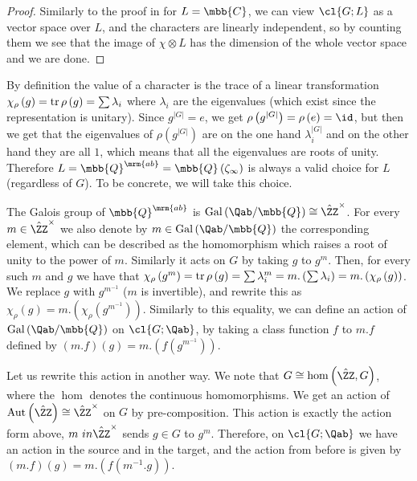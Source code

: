 \begin{proof}
	Similarly to the proof in \cite[9.1]{Ser} for $L = \mbb{C}$, we can view $\cl{G;L}$ as a vector space over $L$, and the characters are linearly independent, so by counting them we see that the image of $\chi \otimes L$ has the dimension of the whole vector space and we are done.
\end{proof}

By definition the value of a character is the trace of a linear transformation $\chi_\rho\left(g\right) = \operatorname{tr} \rho\left(g\right) = \sum \lambda_i$ where $\lambda_i$ are the eigenvalues (which exist since the representation is unitary).
Since $g^{\left|G\right|} = e$, we get $\rho\left(g^{\left|G\right|}\right) = \rho\left(e\right) = \id$, but then we get that the eigenvalues of $\rho\left(g^{\left|G\right|}\right)$ are on the one hand $\lambda_i^{\left|G\right|}$ and on the other hand they are all $1$, which means that all the eigenvalues are roots of unity.
Therefore $L = \mbb{Q}^\mrm{ab} = \mbb{Q}\left(\zeta_\infty\right)$ is always a valid choice for $L$ (regardless of $G$).
To be concrete, we will take this choice.

The Galois group of $\mbb{Q}^\mrm{ab}$ is $\Gal\left(\Qab / \mbb{Q}\right) \cong {\hat\ZZ}^\times$.
For every $m \in {\hat\ZZ}^\times$ we also denote by $m \in \Gal\left(\Qab / \mbb{Q}\right)$ the corresponding element, which can be described as the homomorphism which raises a root of unity to the power of $m$.
Similarly it acts on $G$ by taking $g$ to $g^m$.
Then, for every such $m$ and $g$ we have that
$
\chi_\rho\left(g^m\right)
= \operatorname{tr} \rho\left(g\right)
= \sum \lambda_i^m
= m. \left(\sum \lambda_i\right)
= m. \left(\chi_\rho\left(g\right)\right)
$.
We replace $g$ with $g^{m^{-1}}$ ($m$ is invertible), and rewrite this as $\chi_\rho\left(g\right) = m. \left(\chi_\rho\left(g^{m^{-1}}\right)\right)$.
Similarly to this equality, we can define an action of $\Gal\left(\Qab / \mbb{Q}\right)$ on $\cl{G; \Qab}$, by taking a class function $f$ to $m.f$ defined by $\left(m.f\right)\left(g\right) = m. \left(f\left(g^{m^{-1}}\right)\right)$.

Let us rewrite this action in another way.
We note that $G \cong \hom\left(\hat\ZZ, G\right)$, where the $\hom$ denotes the continuous homomorphisms.
We get an action of $\aut\left(\hat\ZZ\right) \cong {\hat\ZZ}^\times$ on $G$ by pre-composition.
This action is exactly the action form above, $m \ in {\hat\ZZ}^\times$ sends $g \in G$ to $g^m$.
Therefore, on $\cl{G; \Qab}$ we have an action in the source and in the target, and the action from before is given by $\left(m.f\right)\left(g\right) = m. \left(f\left(m^{-1}.g\right)\right)$.

